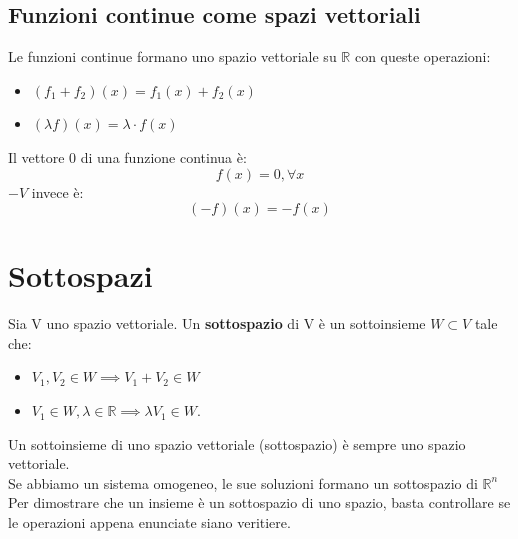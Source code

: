 \documentclass[12pt,a4paper]{article}
\let\oldsection\section
\renewcommand{\section}{\clearpage\oldsection}
\begin{document}
\subsection{Funzioni continue come spazi vettoriali}
Le funzioni continue formano uno spazio vettoriale su $\mathbb{R}$ con queste operazioni:
\begin{itemize}
  \item $(f_1 + f_2)(x) = f_1(x) + f_2(x)$
  \item $(\lambda f)(x) = \lambda \cdot f(x)$
\end{itemize}
Il vettore 0 di una funzione continua è:
\[
f(x) = 0, \forall x
\]
$-V$ invece è:
\[
(-f)(x) = -f(x)
\]
\section{Sottospazi}
Sia V uno spazio vettoriale. Un \textbf{sottospazio} di V è un sottoinsieme $W \subset V$ tale che:
\begin{itemize}
  \item $V_1,V_2 \in W \implies V_1 + V_2 \in W$
  \item $V_1 \in W, \lambda \in \mathbb{R} \implies \lambda V_1 \in W$.
\end{itemize} 
Un sottoinsieme di uno spazio vettoriale (sottospazio) è sempre uno spazio vettoriale.\\
Se abbiamo un sistema omogeneo, le sue soluzioni formano un sottospazio di $\mathbb{R}^n$\\
Per dimostrare che un insieme è un sottospazio di uno spazio, basta controllare se le operazioni appena enunciate siano veritiere.
\end{document}
